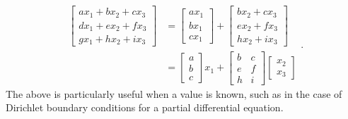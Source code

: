 \documentclass[ltr]{ornltm-app-mod} %
\numberwithin{equation}{section}
\begin{document}
    \begin{equation}
        \label{eq:matrix-expansion}
        \begin{split}
            \begin{bmatrix}
                ax_1+bx_2+cx_3 \\
                dx_1+ex_2+fx_3 \\
                gx_1+hx_2+ix_3
            \end{bmatrix}
            &=
            \begin{bmatrix}
                ax_1 \\
                bx_1 \\
                cx_1
            \end{bmatrix}+\begin{bmatrix}
                              bx_2+cx_3 \\
                              ex_2+fx_3 \\
                              hx_2+ix_3
            \end{bmatrix}\\
            &=
            \begin{bmatrix}
                a \\
                b \\
                c
            \end{bmatrix}x_1 +
            \begin{bmatrix}
                b & c \\
                e & f \\
                h & i
            \end{bmatrix}\begin{bmatrix}
                             x_2 \\
                             x_3
            \end{bmatrix}
        \end{split}.
    \end{equation}
    The above is particularly useful when a value is known, such as in the case of Dirichlet boundary conditions for a partial differential equation.




\end{document}
